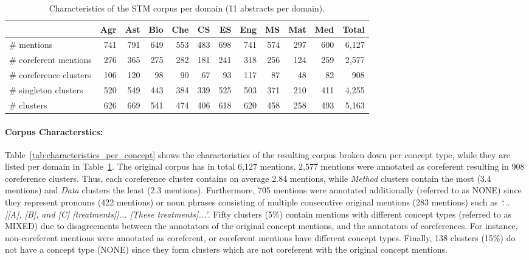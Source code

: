 \documentclass[runningheads]{llncs}
\begin{document}
\begin{table}[t!]
\centering
\small
\caption{Characteristics of the STM corpus per domain (11 abstracts per domain).}
\label{tab:corpus_characteristics_per_domain}
\begin{tabular}{l|rrrrrrrrrr|r}
                  & Agr & Ast & Bio & Che & CS  & ES  & Eng & MS  & Mat & Med & Total \\ \hline
\# mentions           & 741 & 791 & 649 & 553 & 483 & 698 & 741 & 574 & 297 & 600 & 6,127 \\
\# coreferent mentions & 276 & 365 & 275 & 282 & 181 & 241 & 318 & 256 & 124 & 259 & 2,577 \\ \hline
\# coreference clusters            & 106 & 120 & 98  & 90  & 67  & 93  & 117 & 87  & 48  & 82  & 908  \\
\# singleton clusters          & 520 & 549 & 443 & 384 & 339 & 525 & 503 & 371 & 210 & 411 & 4,255 \\ \hline
\# clusters            & 626 & 669 & 541 & 474 & 406 & 618 & 620 & 458 & 258 & 493 & 5,163 \\ 
\end{tabular}
\vspace{-1em}
\end{table}

\paragraph{Corpus Characterstics:}


Table~\ref{tab:characteristics_per_concept} shows the characteristics of the resulting corpus broken down per concept type, while they are listed per domain in Table~\ref{tab:corpus_characteristics_per_domain}. The original corpus has in total 6,127 mentions. 2,577 mentions were annotated as coreferent resulting in 908 coreference clusters. 
Thus, each coreference cluster contains on average 2.84 mentions, while \emph{Method} clusters contain the most (3.4 mentions) and \emph{Data} clusters the least (2.3 mentions).
Furthermore,  705 mentions were annotated additionally (referred to as NONE) since they represent pronouns (422 mentions) or noun phrases consisting of multiple consecutive original mentions (283 mentions) such as \textit{`... [[A], [B], and [C] [treatments]]... [These treatments]...'}.
Fifty clusters (5\%) contain mentions with different concept types (referred to as MIXED) due to disagreements between the annotators of the original concept mentions, and the annotators of coreferences. For instance, non-coreferent mentions were annotated as coreferent, or coreferent mentions have different concept types.
Finally, 138 clusters (15\%) do not have a concept type (NONE) since they form clusters which are not coreferent with the original concept mentions.
\end{document}
